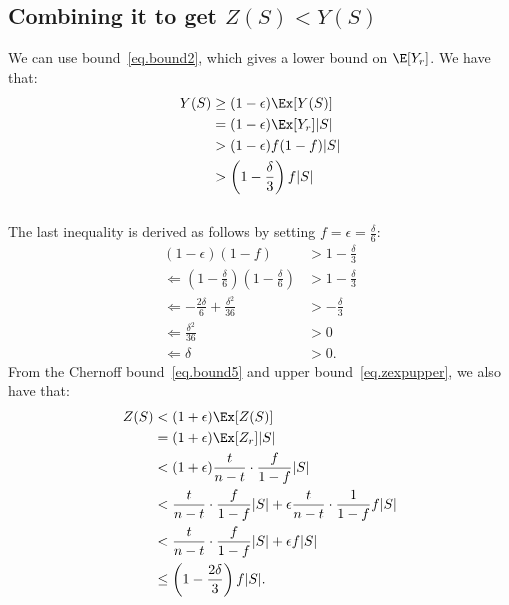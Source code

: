 
\subsection{Combining it to get $Z(S) < Y(S)$}
We can use bound~\ref{eq.bound2}, which gives a lower bound on $\E[Y_r]$.
We have that:
\begin{align}
Y(S) & \geq (1-\epsilon)\Ex[Y(S)] \\
& = (1-\epsilon)\Ex[Y_r] |S| \\
&> (1-\epsilon)f(1-f)|S|\\
&>  \left(1 - \frac{\delta}{3}\right)f|S| \label{eq.ylower}
\end{align}\\
The last inequality is derived as follows by setting $f = \epsilon = \frac{\delta}{6}$:
\begin{align}
 (1-\epsilon)(1-f) &> 1 - \frac{\delta}{3}\\
 \Leftarrow \left(1-\frac{\delta}{6}\right)\left(1-\frac{\delta}{6}\right) &> 1-\frac{\delta}{3}\\
 \Leftarrow -\frac{2\delta}{6} + \frac{\delta^2}{36} &> -\frac{\delta}{3}\\
 \Leftarrow \frac{\delta^2}{36} &> 0\\
 \Leftarrow \delta &> 0.
\end{align}
From the Chernoff bound~\ref{eq.bound5} and upper bound~\ref{eq.zexpupper}, we also have that:
\begin{align}
Z(S) &< (1+\epsilon)\Ex[Z(S)]\\
&=(1+\epsilon)\Ex[Z_r]|S|\\
&<(1+\epsilon)\frac{t}{n-t} \cdot \frac{f}{1-f} |S|\\
&<\frac{t}{n-t} \cdot \frac{f}{1-f} |S|+\epsilon\frac{t}{n-t} \cdot \frac{1}{1-f} f|S|\\
&< \frac{t}{n-t} \cdot \frac{f}{1-f} |S| + \epsilon f|S|\label{eq.balance}\\
&\leq \left(1 - \frac{2\delta}{3}\right)f|S|\label{eq.zupper}.
\end{align}\\

